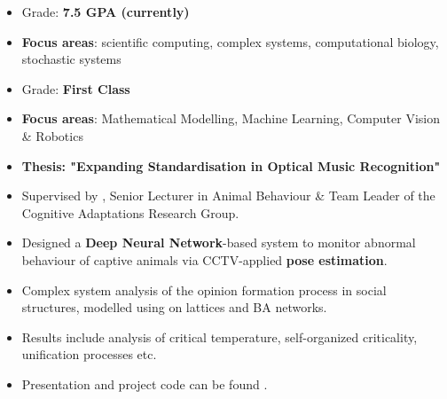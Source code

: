 \documentclass[11pt,a4paper,ragged2e,withhyper]{altacv}
\begin{document}
\begin{paracol}{2}

\begin{itemize}
    \item Grade: \textbf{7.5 GPA (currently)}
    \item \textbf{Focus areas}: scientific computing, complex  systems, computational biology, stochastic systems
\end{itemize}

\medskip

\begin{itemize}
    \item Grade: \textbf{First Class}
    \item \textbf{Focus areas}: Mathematical Modelling,  Machine Learning, Computer Vision \& Robotics
    \item \textbf{Thesis: "Expanding Standardisation in Optical Music Recognition"}
\end{itemize}


\begin{itemize}
    \item Supervised by , Senior Lecturer in Animal Behaviour \& Team Leader of the Cognitive Adaptations Research Group.
    \item Designed a \textbf{Deep Neural Network}-based system to monitor abnormal behaviour of captive animals via CCTV-applied \textbf{pose estimation}.
\end{itemize}


\begin{itemize}
    \item Complex system analysis of the opinion formation process in social structures, modelled using   on lattices and BA networks.
    \item Results include analysis of critical temperature, self-organized criticality, unification processes etc.
    \item Presentation and project code can be found   .
\end{itemize}


\end{paracol}
\end{document}
